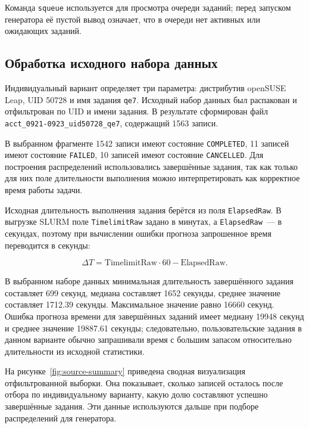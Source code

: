 Команда \texttt{squeue} используется для просмотра очереди заданий; перед запуском генератора её пустой вывод означает, что в очереди нет активных или ожидающих заданий.

\subsection{Обработка исходного набора данных}

Индивидуальный вариант определяет три параметра: дистрибутив openSUSE Leap, UID 50728 и имя задания \texttt{qe7}. Исходный набор данных был распакован и отфильтрован по UID и имени задания. В результате сформирован файл \texttt{acct_0921-0923_uid50728_qe7}, содержащий 1563 записи.

В выбранном фрагменте 1542 записи имеют состояние \texttt{COMPLETED}, 11 записей имеют состояние \texttt{FAILED}, 10 записей имеют состояние \texttt{CANCELLED}. Для построения распределений использовались завершённые задания, так как только для них поле длительности выполнения можно интерпретировать как корректное время работы задачи.

Исходная длительность выполнения задания берётся из поля \texttt{ElapsedRaw}. В выгрузке SLURM поле \texttt{TimelimitRaw} задано в минутах, а \texttt{ElapsedRaw}~--- в секундах, поэтому при вычислении ошибки прогноза запрошенное время переводится в секунды:

\[
    \Delta T = \text{TimelimitRaw} \cdot 60 - \text{ElapsedRaw}.
\]

В выбранном наборе данных минимальная длительность завершённого задания составляет 699 секунд, медиана составляет 1652 секунды, среднее значение составляет 1712.39 секунды. Максимальное значение равно 16660 секунд. Ошибка прогноза времени для завершённых заданий имеет медиану 19948 секунд и среднее значение 19887.61 секунды; следовательно, пользовательские задания в данном варианте обычно запрашивали время с большим запасом относительно длительности из исходной статистики.

На рисунке~\ref{fig:source-summary} приведена сводная визуализация отфильтрованной выборки. Она показывает, сколько записей осталось после отбора по индивидуальному варианту, какую долю составляют успешно завершённые задания. Эти данные используются дальше при подборе распределений для генератора.


